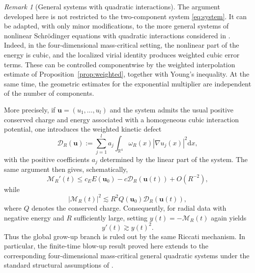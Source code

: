 \documentclass[12pt]{amsart}
\numberwithin{equation}{section}
\theoremstyle{remark}
\newtheorem{remark}[theorem]{Remark}
\newcommand{\dd}{\mathrm{d}x}
\begin{document}
\begin{remark}[General systems with quadratic interactions]
The argument developed here is not restricted to the two-component system \eqref{eq:system}. It can be adapted, with only minor modifications, to the more general systems of nonlinear Schr\"odinger equations with quadratic interactions considered in \cite{DF,NP}. Indeed, in the four-dimensional mass-critical setting, the nonlinear part of the energy is cubic, and the localized virial identity produces weighted cubic error terms. These can be controlled componentwise by the weighted interpolation estimate of Proposition~\ref{prop:weighted}, together with Young's inequality. At the same time, the geometric estimates for the exponential multiplier are independent of the number of components.

More precisely, if $\mathbf u=(u_1,\ldots,u_l)$ and the system admits the usual positive conserved charge and energy associated with a homogeneous cubic interaction potential, one introduces the weighted kinetic defect
\[
 \mathcal D_R(\mathbf u) := \sum_{j=1}^l a_j \int_{\mathbb R^4} \omega_R(x)|\nabla u_j(x)|^2\dd,
\]
with the positive coefficients $a_j$ determined by the linear part of the system. The same argument then gives, schematically,
\[
 \mathcal M_R'(t) \le c_E E(\mathbf u_0) -c \mathcal D_R(\mathbf u(t)) +O(R^{-2}),
\]
while
\[
 |\mathcal M_R(t)|^2 \lesssim R^2 Q(\mathbf u_0) \mathcal D_R(\mathbf u(t)),
\]
where $Q$ denotes the conserved charge. Consequently, for radial data with negative energy and $R$ sufficiently large, setting $y(t)=-\mathcal M_R(t)$ again yields
\[
 y'(t)\gtrsim y(t)^2.
\]
Thus the global grow-up branch is ruled out by the same Riccati mechanism. In particular, the finite-time blow-up result proved here extends to the corresponding four-dimensional mass-critical general quadratic systems under the standard structural assumptions of \cite{DF,NP}.
\end{remark}
\end{document}
